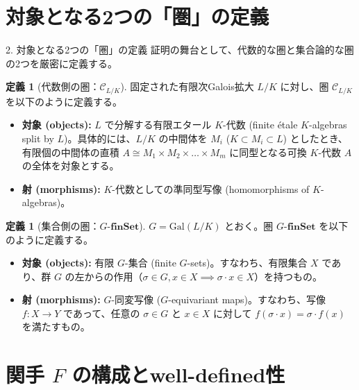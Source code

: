 \documentclass[10pt, unicode]{beamer}
\theoremstyle{definition}
\newtheorem{defn}[thm]{定義}
\begin{document}
\section{対象となる2つの「圏」の定義}

\begin{frame}[allowframebreaks]{2. 対象となる2つの「圏」の定義}
    証明の舞台として、代数的な圏と集合論的な圏の2つを厳密に定義する。

    \begin{defn}[代数側の圏：$\mathcal{C}_{L/K}$]
        固定された有限次Galois拡大 $L/K$ に対し、圏 $\mathcal{C}_{L/K}$ を以下のように定義する。
        \begin{itemize}
            \item \textbf{対象 (objects):} $L$ で分解する有限エタール $K$-代数 (finite étale $K$-algebras split by $L$)。具体的には、$L/K$ の中間体を $M_i$ ($K \subset M_i \subset L$) としたとき、有限個の中間体の直積 $A \cong M_1 \times M_2 \times \dots \times M_m$ に同型となる可換 $K$-代数 $A$ の全体を対象とする。
            \item \textbf{射 (morphisms):} $K$-代数としての準同型写像 (homomorphisms of $K$-algebras)。
        \end{itemize}
    \end{defn}

    \begin{defn}[集合側の圏：$G\text{-}\mathbf{finSet}$]
        $G = \mathrm{Gal}(L/K)$ とおく。圏 $G\text{-}\mathbf{finSet}$ を以下のように定義する。
        \begin{itemize}
            \item \textbf{対象 (objects):} 有限 $G$-集合 (finite $G$-sets)。すなわち、有限集合 $X$ であり、群 $G$ の左からの作用（$\sigma \in G, x \in X \implies \sigma \cdot x \in X$）を持つもの。
            \item \textbf{射 (morphisms):} $G$-同変写像 ($G$-equivariant maps)。すなわち、写像 $f: X \to Y$ であって、任意の $\sigma \in G$ と $x \in X$ に対して $f(\sigma \cdot x) = \sigma \cdot f(x)$ を満たすもの。
        \end{itemize}
    \end{defn}
\end{frame}

\section{関手 $F$ の構成とwell-defined性}
\end{document}
